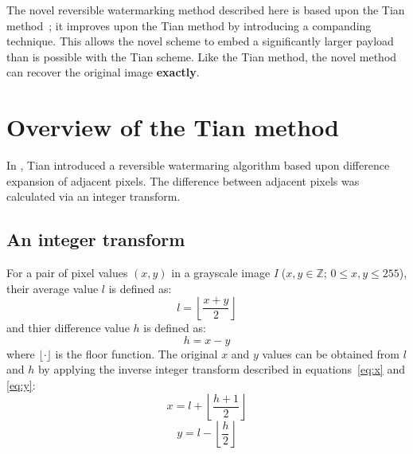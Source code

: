 \documentclass[10pt,twocolumn,letterpaper]{article}
\begin{document}
{The novel reversible watermarking method described here is based upon the Tian method~\cite{tian03}; 
it improves upon the Tian method by introducing a companding technique. 
This allows the novel scheme to embed a significantly larger payload than is possible with the Tian scheme.
Like the Tian method, the novel method can recover the original image {\bf exactly}.



\section{Overview of the Tian method}
\label{sec:tian}
In \cite{tian03}, Tian introduced a reversible watermaring algorithm based upon difference expansion of adjacent
pixels. The difference between adjacent pixels was calculated via an integer transform.  

\subsection{An integer transform}
\label{sec:intTx}
For a pair of pixel values $(x,y)$ in a grayscale image \emph{I} ($x,y \in \mathbb{Z}$;
$0 \leq x,y \leq 255$), their average value $l$ is defined as:
\begin{equation}
\label{eq:l}
l = \left \lfloor \frac{x+y}{2} \right \rfloor 
\end{equation}
and thier difference value $h$ is defined as:
\begin{equation}
\label{eq:h}
h=x-y
\end{equation}
where $\lfloor \cdot \rfloor$ is the floor function.
The original $x$ and $y$ values can be obtained from $l$ and $h$
by applying the inverse integer transform described in
equations~\ref{eq:x} and \ref{eq:y}:
\begin{equation}
\label{eq:x}
x = l + \left \lfloor \frac{h+1}{2} \right \rfloor
\end{equation}
\begin{equation}
\label{eq:y}
y=l - \left \lfloor \frac{h}{2} \right \rfloor
\end{equation}

}
\end{document}
